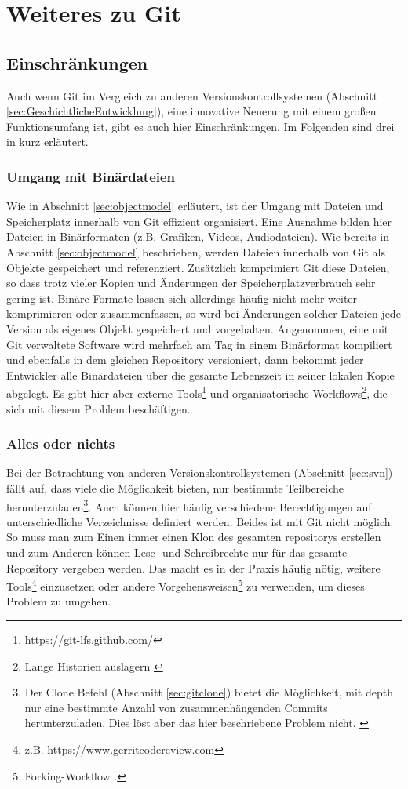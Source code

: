 \chapter{Weiteres zu Git}\label{cha:somethingmore}
\section{Einschränkungen}\label{sec:problems}
Auch wenn Git im Vergleich zu anderen Versionskontrollsystemen (Abschnitt
\ref{sec:GeschichtlicheEntwicklung}), eine innovative Neuerung mit einem großen
Funktionsumfang ist, gibt es auch hier Einschränkungen. Im Folgenden sind drei
in kurz erläutert.

\subsection{Umgang mit Binärdateien}\label{sec:binaries}
Wie in Abschnitt \ref{sec:objectmodel} erläutert, ist der Umgang mit
Dateien und Speicherplatz innerhalb von Git effizient organisiert. Eine
Ausnahme bilden hier Dateien in Binärformaten (z.B.  Grafiken, Videos,
Audiodateien). Wie bereits in Abschnitt \ref{sec:objectmodel} beschrieben,
werden Dateien innerhalb von Git als Objekte gespeichert und referenziert.
Zusätzlich komprimiert Git diese Dateien, so dass trotz vieler Kopien und
Änderungen der Speicherplatzverbrauch sehr gering ist. Binäre Formate lassen
sich allerdings häufig nicht mehr weiter komprimieren oder zusammenfassen, so
wird bei Änderungen solcher Dateien jede Version als eigenes Objekt
gespeichert und vorgehalten. Angenommen, eine mit Git verwaltete Software wird
mehrfach am Tag in einem Binärformat kompiliert und ebenfalls in dem gleichen
Repository versioniert, dann bekommt jeder Entwickler alle Binärdateien über
die gesamte Lebenszeit in seiner lokalen Kopie abgelegt.  Es gibt hier aber
externe Tools\footnote{https://git-lfs.github.com/} und organisatorische
Workflows\footnote{Lange Historien auslagern \cite[S.~235-244]{gitwf}}, die sich
mit diesem Problem beschäftigen. \cite[S.~300]{gitwf}

\subsection{Alles oder nichts}
Bei der Betrachtung von anderen Versionskontrollsystemen (Abschnitt
\ref{sec:svn}) fällt auf, dass viele die Möglichkeit bieten, nur bestimmte
Teilbereiche herunterzuladen\footnote{Der Clone Befehl (Abschnitt
\ref{sec:gitclone}) bietet die Möglichkeit, mit \-{}\-{}depth nur eine
bestimmte Anzahl von zusammenhängenden Commits herunterzuladen. Dies löst aber das
hier beschriebene Problem nicht. \cite[S.~244]{gitwf}}. Auch können hier
häufig verschiedene Berechtigungen auf unterschiedliche Verzeichnisse definiert
werden.  Beides ist mit Git nicht möglich. So muss man zum Einen immer einen
Klon des gesamten \glspl{repository} erstellen und zum Anderen können Lese- und
Schreibrechte nur für das gesamte Repository vergeben werden. Das macht es in
der Praxis häufig nötig, weitere Tools\footnote{z.B.
https://www.gerritcodereview.com} einzusetzen oder andere
Vorgehensweisen\footnote{Forking-Workflow \cite[S.~163-173]{gitwf}.} zu
verwenden, um dieses Problem zu umgehen. \cite[300-302]{gitwf}

